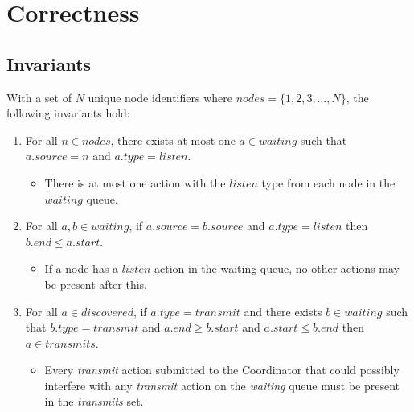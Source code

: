 \section{Correctness}

\subsection{Invariants}\label{sec:coordinator-invariants}

With a set of $N$ unique node identifiers where $\mathit{nodes} = \{ 1, 2, 3, \ldots, N \}$, %
the following invariants hold:

\begin{enumerate}
    \item For all $n \in \mathit{nodes}$, there exists at most one $a \in \mathit{waiting}$ such that 
          $a.\mathit{source} = n$ and $a.\mathit{type} = \mathit{listen}$.
          \begin{itemize}
              \item There is at most one action with the $\mathit{listen}$ type from each node in the 
                    $\mathit{waiting}$ queue.
          \end{itemize}
    \item For all $a, b \in \mathit{waiting}$, if $a.\mathit{source} = b.\mathit{source}$ and 
          $a.\mathit{type} = \mathit{listen}$ then $b.\mathit{end} \leq a.\mathit{start}$.
          \begin{itemize}
              \item If a node has a $\mathit{listen}$ action in the waiting queue, no other actions may be 
                    present after this.
          \end{itemize}
    \item For all $a \in \mathit{discovered}$, if $a.\mathit{type} = \mathit{transmit}$ and there exists 
          $b \in \mathit{waiting}$ such that $b.\mathit{type} = \mathit{transmit}$ and 
          $a.\mathit{end} \geq b.\mathit{start}$ and $a.\mathit{start} \leq b.\mathit{end}$ then 
          $a \in \mathit{transmits}$.
          \begin{itemize}
              \item Every \textit{transmit} action submitted to the Coordinator that could possibly 
                    interfere with any \textit{transmit} action on the \textit{waiting} queue must be 
                    present in the \textit{transmits} set.
          \end{itemize}
\end{enumerate}


